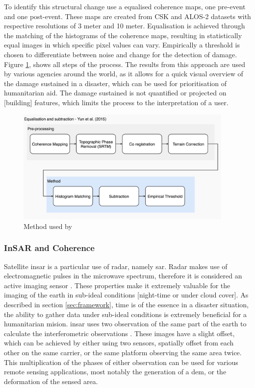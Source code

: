 \noindent To identify this structural change \citet{Yun2015} use a equalised coherence maps, one pre-event and one post-event. These maps are created from CSK and ALOS-2 datasets with respective resolutions of 3 meter and 10 meter. Equalisation is achieved through the matching of the histograms of the coherence maps, resulting in statistically equal images in which specific pixel values can vary. Empirically a threshold is chosen to differentiate between noise and change for the detection of damage. Figure \ref{fig:yun}, shows all steps of the process. The results from this approach are used by various agencies around the world, as it allows for a quick visual overview of the damage sustained in a disaster, which can be used for prioritisation of humanitarian aid. The damage sustained is not quantified or projected on [building] features, which limits the process to the interpretation of a user.

\begin{figure}[!h]
	\centering
	\captionsetup{justification=raggedright,singlelinecheck=false}
	\includegraphics[width=0.95\textwidth]{figs/Yun.png}
	\caption{\footnotesize{Method used by \citet{Yun2015}}}
	\label{fig:yun}
\end{figure}

\subsubsection*{InSAR and Coherence}
Satellite \ac{insar} is a particular use of radar, namely \ac{sar}. Radar makes use of electromagnetic pulses in the microwave spectrum, therefore it is considered an active imaging sensor \citep{Hanssen2001, Ferretti2007}. These properties make it extremely valuable for the imaging of the earth in sub-ideal conditions [night-time or under cloud cover]. As described in section \ref{sec:framework}, time is of the essence in a disaster situation, the ability to gather data under sub-ideal conditions is extremely beneficial for a humanitarian mision. \ac{insar} uses two observation of the same part of the earth to calculate the interferometric observations \citep{Ferretti2007}. These images have a slight offset, which can be achieved by either using two sensors, spatially offset from each other on the same carrier, or the same platform observing the same area twice. This multiplication of the phases of either observation can be used for various remote sensing applications, most notably the generation of a \ac{dem}, or the deformation of the sensed area.\\

